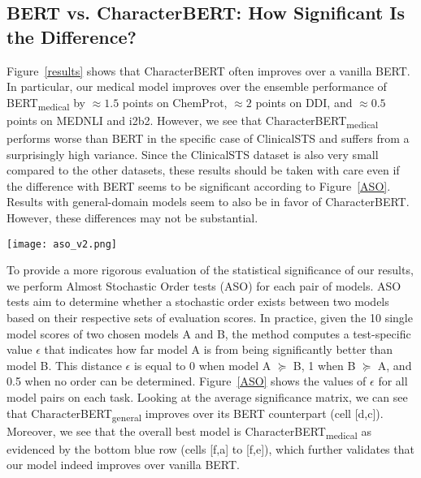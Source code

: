 \documentclass[11pt]{article}
\begin{document}
\subsection{BERT vs. CharacterBERT: How Significant Is the Difference?}

Figure~\ref{results} shows that CharacterBERT often improves over a vanilla BERT. In particular, our medical model improves over the ensemble performance of BERT\textsubscript{medical} by $\approx1.5$ points on ChemProt, $\approx2$ points on DDI, and $\approx0.5$ points on MEDNLI and i2b2. However, we see that CharacterBERT\textsubscript{medical} performs worse than BERT in the specific case of ClinicalSTS and suffers from a surprisingly high variance. Since the ClinicalSTS dataset is also very small compared to the other datasets, these results should be taken with care even if the difference with BERT seems to be significant according to Figure~\ref{ASO}. Results with general-domain models seem to also be in favor of CharacterBERT. However, these differences may not be substantial.

\begin{figure*}[h]
\begin{center}
\texttt{[image: aso\_v2.png]}
\end{center} 
\caption{Statistical significance: Minimal distance $\epsilon$ for Almost Stochastic Order at level $\alpha=5\%$. Blue cells mean that the left model is significantly better than the bottom model. Red cells mean the opposite.} \label{ASO}
\end{figure*}

To provide a more rigorous evaluation of the statistical significance of our results, we perform Almost Stochastic Order tests (ASO) \cite{dror-etal-2019-deep} for each pair of models. ASO tests aim to determine whether a stochastic order exists between two models based on their respective sets of evaluation scores. In practice, given the 10 single model scores of two chosen models A and B, the method computes a test-specific value $\epsilon$ that indicates how far model A is from being significantly better than model B. This distance $\epsilon$ is equal to 0 when model A $\succeq$ B, 1 when B $\succeq$ A, and 0.5 when no order can be determined. Figure~\ref{ASO} shows the values of $\epsilon$ for all model pairs on each task. Looking at the average significance matrix, we can see that CharacterBERT\textsubscript{general} improves over its BERT counterpart (cell [d,c]). Moreover, we see that the overall best model is CharacterBERT\textsubscript{medical} as evidenced by the bottom blue row (cells [f,a] to [f,e]), which further validates that our model indeed improves over vanilla BERT.
\end{document}
